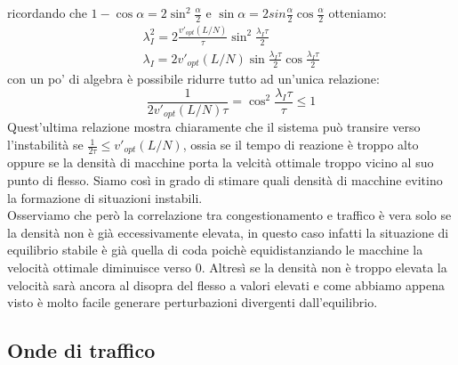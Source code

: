 ricordando che $1-\cos\alpha=2\sin^2\frac{\alpha}{2}$ e $\sin\alpha=2sin\frac{\alpha}{2}\cos\frac{\alpha}{2}$ otteniamo:
\begin{equation*}
	\begin{gathered}
		\lambda_I^2=2\frac{v'_{opt}(L/N)}{\tau}\sin^2\frac{\lambda_I\tau}{2}\\
		\lambda_I=2v'_{opt}(L/N)\sin\frac{\lambda_I\tau}{2}\cos\frac{\lambda_I\tau}{2}
	\end{gathered}
\end{equation*}
con un po' di algebra è possibile ridurre tutto ad un'unica relazione:
\begin{equation}
	\frac{1}{2v'_{opt}(L/N)\tau}=\cos^2\frac{\lambda_I\tau}{\tau}\leq1
\end{equation}
Quest'ultima relazione mostra chiaramente che il sistema può transire verso l'instabilità se $ \frac{1}{2\tau}\leq v'_{opt}(L/N)$, ossia se il tempo di reazione è troppo alto oppure se la densità di macchine porta la velcità ottimale troppo vicino al suo punto di flesso. Siamo così in grado di stimare quali densità di macchine evitino la formazione di situazioni instabili. \\

Osserviamo che però la correlazione tra congestionamento e traffico è vera solo se la densità non è già eccessivamente elevata, in questo caso infatti la situazione di equilibrio stabile è già quella di coda poichè equidistanziando le macchine la velocità ottimale diminuisce verso $0$. Altresì se la densità non è troppo elevata la velocità sarà ancora al disopra del flesso a valori elevati e come abbiamo appena visto è molto facile generare perturbazioni divergenti dall'equilibrio.

\subsection{Onde di traffico}


